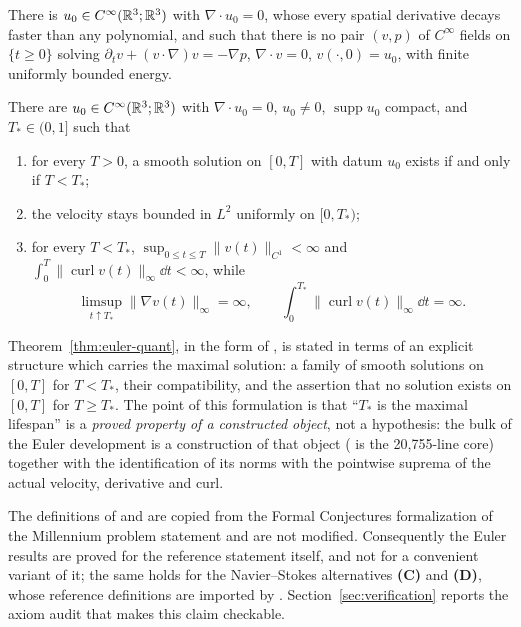 \begin{theorem}
\label{thm:euler-bkm}
There is $u_0\in C^\infty(\mathbb{R}^3;\mathbb{R}^3)$ with $\nabla\cdot u_0=0$, whose every spatial
derivative decays faster than any polynomial, and such that there is no pair $(v,p)$
of $C^\infty$ fields on $\{t\ge0\}$ solving
$\partial_t v+(v\cdot\nabla)v=-\nabla p$, $\nabla\cdot v=0$, $v(\cdot,0)=u_0$, with
finite uniformly bounded energy.
\end{theorem}

\begin{theorem}
\label{thm:euler-quant}
There are $u_0\in C^\infty(\mathbb{R}^3;\mathbb{R}^3)$ with $\nabla\cdot u_0=0$, $u_0\ne0$,
$\operatorname{supp}u_0$ compact, and $T_*\in(0,1]$ such that
\begin{enumerate}[label=\textup{(i\arabic*)}]
  \item for every $T>0$, a smooth solution on $[0,T]$ with datum $u_0$ exists if and only
        if $T<T_*$;
  \item the velocity stays bounded in $L^2$ uniformly on $[0,T_*)$;
  \item for every $T<T_*$, $\sup_{0\le t\le T}\|v(t)\|_{C^1}<\infty$ and
        $\int_0^T\|\operatorname{curl}v(t)\|_\infty\dd t<\infty$, while
        \[
          \limsup_{t\uparrow T_*}\|\nabla v(t)\|_\infty=\infty,
          \qquad
          \int_0^{T_*}\|\operatorname{curl} v(t)\|_\infty\dd t=\infty .
        \]
\end{enumerate}
\end{theorem}

Theorem~\ref{thm:euler-quant}, in the form 
of , is stated in terms of an explicit structure
 which carries the maximal solution: a family of smooth solutions
on $[0,T]$ for $T<T_*$, their compatibility, and the assertion that no solution exists on
$[0,T]$ for $T\ge T_*$. The point of this formulation is that ``$T_*$ is the maximal
lifespan'' is a \emph{proved property of a constructed object}, not a hypothesis: the
bulk of the Euler development is a construction of that object
( is the 20{,}755-line core) together with the identification
of its norms with the pointwise suprema of the actual velocity, derivative and curl.

\begin{remark}
\label{rem:fidelity}
The definitions of  and
 are copied from the Formal Conjectures
formalization of the Millennium problem statement and are not modified. Consequently the
Euler results are proved for the reference statement itself, and not for a convenient
variant of it; the same holds for the Navier--Stokes alternatives \textbf{(C)} and
\textbf{(D)}, whose reference definitions are imported by
. Section~\ref{sec:verification} reports the
axiom audit that makes this claim checkable.
\end{remark}
